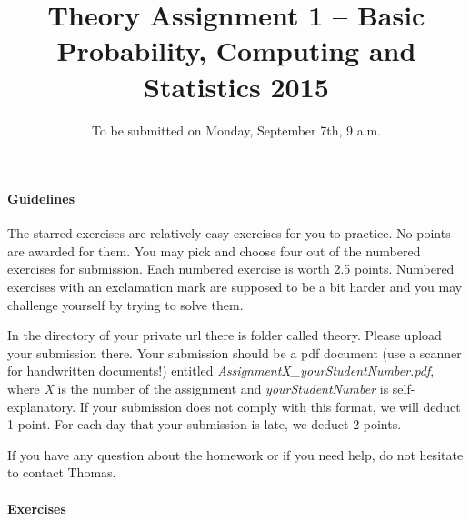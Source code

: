 \documentclass{article}
\title{Theory Assignment 1 -- Basic Probability, Computing and Statistics 2015}
\author{}
\date{To be submitted on Monday, September 7th, 9 a.m.}
\begin{document}
\maketitle

\paragraph{Guidelines}
The starred exercises are relatively easy exercises for you to practice. No points are awarded for them. You may pick and choose four out of the numbered
exercises for submission. Each numbered exercise is worth 2.5 points. Numbered exercises with an exclamation mark are supposed to be a bit harder and you
may challenge yourself by trying to solve them.

In the directory of your private url there is folder called theory. Please upload your submission there. Your submission should be
a pdf document (use a scanner for handwritten documents!) entitled \textit{AssignmentX\_yourStudentNumber.pdf}, where \textit{X} is the number of the
assignment and \textit{yourStudentNumber} is self-explanatory. If your submission does not comply with this format, we will deduct 1 point. For each day that
your submission is late, we deduct 2 points.

If you have any question about the homework or if you need help, do not hesitate to contact Thomas.

\paragraph{Exercises}
\end{document}
